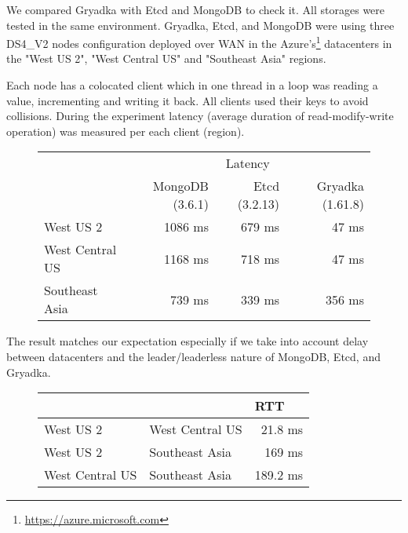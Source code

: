 \documentclass[a4paper,USenglish]{lipics-v2018}
\theoremstyle{definition}
\begin{document}
We compared Gryadka with Etcd and MongoDB to check it. All storages were tested in the same environment. Gryadka, Etcd, and MongoDB were using three DS4\_V2 nodes configuration deployed over WAN in the Azure's\footnote{\href{https://azure.microsoft.com}{https://azure.microsoft.com}} datacenters in the "West US 2", "West Central US" and "Southeast Asia" regions.

Each node has a colocated client which in one thread in a loop was reading a value, incrementing and writing it back. All clients used their keys to avoid collisions. During the experiment latency (average duration of read-modify-write operation) was measured per each client (region).

\begin{figure}[!htb]
    \centering
    \begin{tabular}{c|r|r|r|}
        \cline{2-4}
        & \multicolumn{3}{|c|}{Latency} \\
        \cline{2-4}
        & MongoDB (3.6.1) & Etcd (3.2.13) & Gryadka (1.61.8) \\
        \hline
        \multicolumn{1}{|l|}{West US 2} & 1086 ms & 679 ms & 47 ms \\
        \hline
        \multicolumn{1}{|l|}{West Central US} & 1168 ms & 718 ms & 47 ms \\
        \hline
        \multicolumn{1}{|l|}{Southeast Asia} & 739 ms & 339 ms & 356 ms \\
        \hline
    \end{tabular}
\end{figure}

The result matches our expectation especially if we take into account delay between datacenters and the leader/leaderless nature of MongoDB, Etcd, and Gryadka.

\begin{figure}[!h]
    \centering
    \begin{tabular}{llr|}
        \cline{3-3}
        & & \multicolumn{1}{|l|}{RTT} \\
        \hline
        \multicolumn{1}{|l|}{West US 2} & \multicolumn{1}{|l|}{West Central US} & 21.8 ms\\
        \hline
        \multicolumn{1}{|l|}{West US 2} & \multicolumn{1}{|l|}{Southeast Asia} & 169 ms\\
        \hline
        \multicolumn{1}{|l|}{West Central US} & \multicolumn{1}{|l|}{Southeast Asia} & 189.2 ms\\
        \hline
    \end{tabular}
\end{figure}
\end{document}
